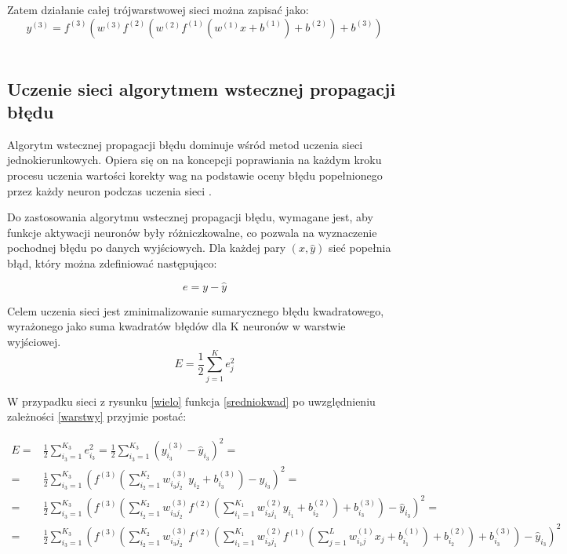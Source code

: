 \documentclass[12pt,twoside]{article}
\begin{document}
Zatem działanie całej trójwarstwowej sieci można zapisać jako:
\begin{equation}
y^{(3)} = f^{(3)}\left( w^{(3)} f^{(2)} \left( w^{(2)}f^{(1)} \left( w^{(1)}x + b^{(1)}\right) + b^{(2)} \right) + b^{(3)} \right)
\end{equation}
\\


\subsection{Uczenie sieci algorytmem wstecznej propagacji błędu}

Algorytm wstecznej propagacji błędu dominuje wśród metod uczenia sieci jednokierunkowych. Opiera się on na koncepcji poprawiania na każdym kroku procesu uczenia wartości korekty wag na podstawie oceny błędu popełnionego przez każdy neuron podczas uczenia sieci \cite{leksykon}. 

Do zastosowania algorytmu wstecznej propagacji błędu, wymagane jest, aby funkcje aktywacji neuronów były różniczkowalne, co pozwala na wyznaczenie pochodnej błędu po danych wyjściowych. Dla każdej pary $(x, \hat{y})$ sieć popełnia błąd, który można zdefiniować następująco:

\begin{equation}
e = y - \hat{y}
\end{equation}

Celem uczenia sieci jest zminimalizowanie sumarycznego błędu kwadratowego, wyrażonego jako suma kwadratów błędów dla K neuronów w warstwie wyjściowej.
\begin{equation}\label{sredniokwad}
E = \frac{1}{2} \sum_{j=1}^{K} e_{j}^2
\end{equation}

W przypadku sieci z rysunku \ref{wielo} funkcja \ref{sredniokwad} po uwzględnieniu zależności \ref{warstwy} przyjmie postać:

\begin{equation}
\begin{aligned}
E =& \frac{1}{2} \sum_{i_{3}=1}^{K_{3}} e_{i_{3}}^2 = \frac{1}{2} \sum_{i_{3}=1}^{K_{3}}\left( y_{i_{3}}^{(3)} - \hat{y}_{i_{3}} \right)^2 =\\
 =& \frac{1}{2} \sum_{i_{3}=1}^{K_{3}} \left( f^{(3)}\left( \sum_{i_{2}=1}^{K_{2}} w_{i_{3}j_{2}}^{(3)}y_{i_{2}} + b_{i_{3}}^{(3)} \right) - \hat{y}_{i_{3}} \right)^2 =\\
=& \frac{1}{2} \sum_{i_{3}=1}^{K_{3}} \left( f^{(3)}\left( \sum_{i_{2}=1}^{K_{2}} w_{i_{3}j_{2}}^{(3)} f^{(2)}\left( \sum_{i_{1}=1}^{K_{1}} w_{i_{2}j_{1}}^{(2)} y_{i_{1}} + b_{i_{2}}^{(2)} \right) + b_{i_{3}}^{(3)} \right) - \hat{y}_{i_{3}} \right)^2 =\\
=& \frac{1}{2} \sum_{i_{3}=1}^{K_{3}} \left( f^{(3)}\left( \sum_{i_{2}=1}^{K_{2}} w_{i_{3}j_{2}}^{(3)} f^{(2)}\left( \sum_{i_{1}=1}^{K_{1}} w_{i_{2}j_{1}}^{(2)} f^{(1)}\left( \sum_{j=1}^{L} w_{i_{1}j}^{(1)} x_{j} + b_{i_{1}}^{(1)} \right) + b_{i_{2}}^{(2)} \right) + b_{i_{3}}^{(3)} \right) - \hat{y}_{i_{3}} \right)^2 
\end{aligned}
\end{equation}\\
\end{document}
